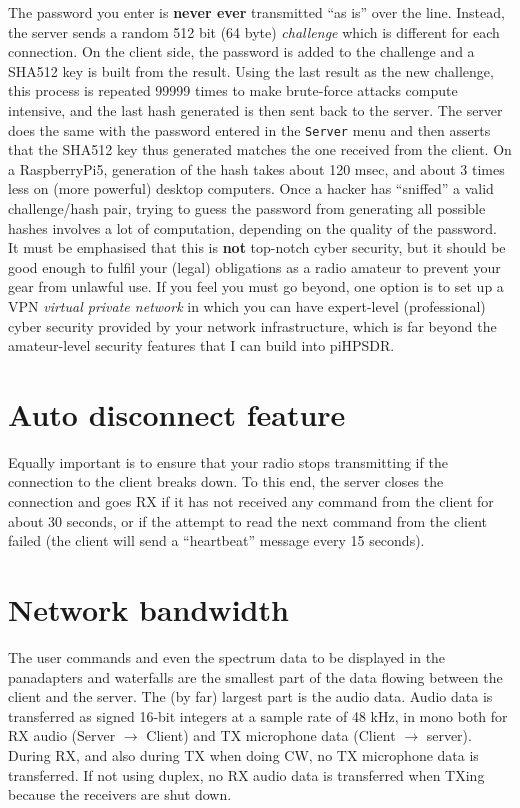 \documentclass[12pt]{book}
\def\bltt#1{\texttt{\color{blue}#1}}
\def\pH{pi\-HPSDR\xspace}
\begin{document}
The password you enter is \textbf{never ever} transmitted ``as is'' over the line. Instead, the server sends a random
512 bit (64 byte) \textit{challenge} which is different for each connection.
On the client side,  the password is added
to the challenge and a SHA512 key is built from the result.  Using the last result as the new challenge,
this process is repeated 99999 times to make brute-force attacks compute intensive,
and the last hash generated is then sent back to the server. The server
does the same with the password entered in the \bltt{Server} menu and then asserts
that the SHA512 key thus generated matches the one received from the client.
On a RaspberryPi5, generation of the hash takes about 120 msec, and about 3 times less on
(more powerful) desktop
computers. Once a hacker has ``sniffed'' a valid challenge/hash pair, trying to guess the password
from generating all possible hashes involves a lot of computation, depending on the quality of the password.
It must be emphasised that this is \textbf{not}  top-notch cyber security, but it should be good enough
to fulfil your  (legal) obligations as a radio amateur to prevent your gear from unlawful use.
If you feel you must go beyond, one option is to set up a VPN \textit{virtual private network} in which
you can have expert-level (professional) cyber security provided by your network infrastructure, which is
far beyond the amateur-level security features that I can build into \pH.

\section{Auto disconnect feature}

Equally important is to ensure that your radio stops transmitting if
the connection to the client breaks down. To this end, the server closes the connection and goes RX if
it has not received any command from the client for about 30 seconds, or if the attempt to read the
next command from the client failed (the client will send a
``heartbeat'' message every 15 seconds).

\section{Network bandwidth}

 The user commands and even the spectrum
data to be displayed in the panadapters and waterfalls are the smallest part of the data flowing between the client
and the server. The (by far) largest part is the audio data. Audio data is transferred as signed 16-bit integers
at a sample rate of 48 kHz, in mono both for RX audio (Server $\to$ Client) and TX
microphone data (Client $\to$ server). During RX, and also during TX when doing CW, no TX microphone data
is transferred. If not using duplex, no RX audio data is transferred when TXing because the receivers are shut down.
\end{document}
